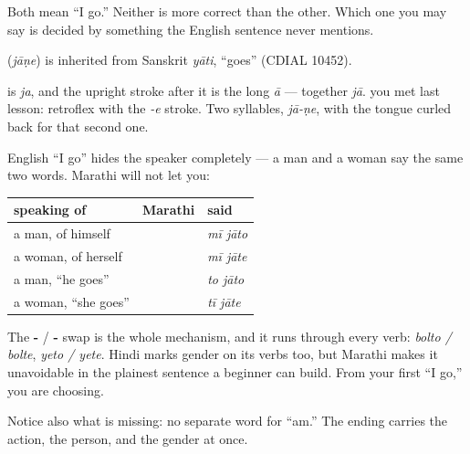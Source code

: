 Both mean \textquotedblleft{}I go.\textquotedblright{} Neither is more correct than the other. Which one you may say is decided by something the English sentence never mentions.

\begin{cousinweb}
\textbf{} (\emph{jāṇe}) is inherited from Sanskrit \emph{yāti}, \textquotedblleft{}goes\textquotedblright{} (CDIAL 10452).
\end{cousinweb}

\begin{sounds}
\textbf{} is \emph{ja}, and the upright stroke after it is the long \emph{ā} — together \textbf{} \emph{jā}. \textbf{} you met last lesson: retroflex \textbf{} with the \emph{-e} stroke. Two syllables, \emph{jā-ṇe}, with the tongue curled back for that second one.
\end{sounds}

\begin{grammarlens}[title={Grammar Lens: the ending declares who is speaking}]
English \textquotedblleft{}I go\textquotedblright{} hides the speaker completely — a man and a woman say the same two words. Marathi will not let you:

\noindent
\begin{tabularx}{\linewidth}{@{}>{\raggedright\arraybackslash}X>{\raggedright\arraybackslash}X>{\raggedright\arraybackslash}X@{}}
\toprule
\textbf{speaking of} & \textbf{Marathi} & \textbf{said} \\
\midrule
a man, of himself & \mr{मी} \mr{जातो} & \emph{mī jāto} \\
a woman, of herself & \mr{मी} \mr{जाते} & \emph{mī jāte} \\
a man, \textquotedblleft{}he goes\textquotedblright{} & \mr{तो} \mr{जातो} & \emph{to jāto} \\
a woman, \textquotedblleft{}she goes\textquotedblright{} & \mr{ती} \mr{जाते} & \emph{tī jāte} \\
\bottomrule
\end{tabularx}

The \textbf{-} / \textbf{-} swap is the whole mechanism, and it runs through every verb: \emph{bolto / bolte}, \emph{yeto / yete}. Hindi marks gender on its verbs too, but Marathi makes it unavoidable in the plainest sentence a beginner can build. From your first \textquotedblleft{}I go,\textquotedblright{} you are choosing.

Notice also what is missing: no separate word for \textquotedblleft{}am.\textquotedblright{} The ending carries the action, the person, and the gender at once.
\end{grammarlens}

